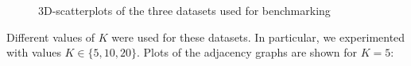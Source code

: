 \begin{figure}[H]
    \caption{3D-scatterplots of the three datasets used for benchmarking}
    \label{scatterplot_3d}
      \end{figure}

\noindent Different values of \(K\) were used for these datasets. In particular, we experimented with values \(K \in \{5, 10, 20\}\). Plots of the adjacency graphs are shown for \(K=5\):

